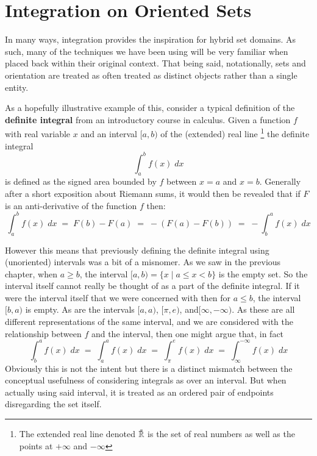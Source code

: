 \chapter{Integration on Oriented Sets}
\label{chp:Integration}


%
%

In many ways, integration provides the inspiration for hybrid set domains.
As such, many of the techniques we have been using will be very familiar when placed back within their original context.
That being said, notationally, sets and orientation are treated as often treated as distinct objects rather than a single entity.


As a hopefully illustrative example of this, consider a typical definition of the \textbf{definite integral} from an introductory
course in calculus.
Given a function $f$ with real variable $x$ and an interval $[a,b)$ of the (extended) real line
\footnote{ The extended real line denoted $\bar{\mathbb{R}}$ is the set of real numbers as well as the points at 
$+\infty$ and $-\infty$} the definite integral
\begin{equation*}
	\int_a^b f(x) \; dx
\end{equation*}
is defined as the signed area bounded by $f$ between $x=a$ and $x=b$.
Generally after a short exposition about Riemann sums, it would then be revealed that if $F$ is an anti-derivative of the
 function $f$ then:
\begin{equation*}
	\int_a^b f(x) \; dx \;=\; F(b)-F(a) \;=\; - (F(a)-F(b)) \;=\; - \int_b^a f(x) \; dx
\end{equation*}




However this means that previously defining the definite integral using (unoriented) intervals was a bit of a misnomer.
As we saw in the previous chapter, when $a \geq b$, the interval $[a,b) = \{ x \;|\; a \leq x < b \}$ is the empty set.
So the interval itself cannot really be thought of as a part of the definite integral.
If it were the interval itself that we were concerned with then for $a \leq b$, the interval $[b,a)$ is empty.
As are the intervals $[a,a)$, $[\pi, e)$, and$[\infty, -\infty)$.
As these are all different representations of the same interval, and we are considered with the relationship between $f$ and
the interval, then one might argue that, in fact
\begin{equation*}
	\int_b^a f(x) \; dx \;=\; \int_a^a f(x) \; dx \;=\; \int_\pi^e f(x)\;dx \;=\; \int_\infty^{-\infty} f(x) \; dx
\end{equation*}
Obviously this is not the intent but there is a distinct mismatch between the conceptual usefulness of considering
integrals as over an interval.
But when actually using said interval, it is treated as an ordered pair of endpoints disregarding the set itself.


